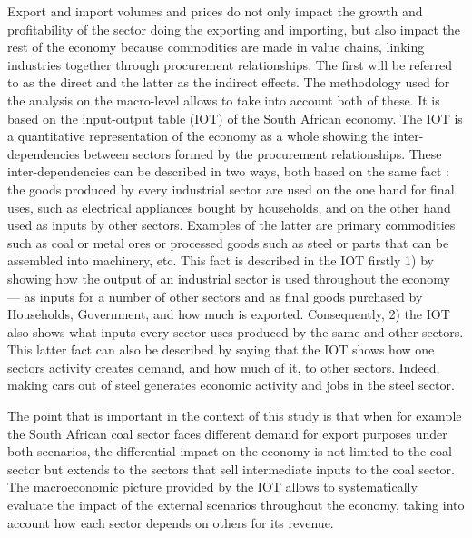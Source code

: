 \documentclass[12pt,english]{article}
\begin{document}
Export and import volumes and prices do not only impact the growth and profitability of the sector doing the exporting and importing, but also impact the rest of the economy because commodities are made in value chains, linking industries together through procurement relationships. The first will be referred to as the direct and the latter as the indirect effects. The methodology used for the analysis on the macro-level allows to take into account both of these.%
It is based on the input-output table (IOT) of the South African economy. The IOT is a quantitative representation of the economy as a whole showing the inter-dependencies between sectors formed by the procurement relationships. These inter-dependencies can be described in two ways, both based on the same fact : the goods produced by every industrial sector are used on the one hand for final uses, such as electrical appliances bought by households, and on the other hand used as inputs by other sectors. Examples of the latter are primary commodities such as coal or metal ores or processed goods such as steel or parts that can be assembled into machinery, etc. This fact is described in the IOT firstly 1) by showing how the output of an industrial sector is used throughout the economy --- as inputs for a number of other sectors and as final goods purchased by Households, Government, and how much is exported. Consequently, 2) the IOT also shows what inputs every sector uses produced by the same and other sectors. This latter fact can also be described by saying that the IOT shows how one sectors activity creates demand, and how much of it, to other sectors. Indeed, making cars out of steel generates economic activity and jobs in the steel sector. 

The point that is important in the context of this study %
is that when for example the South African coal sector faces different demand for export purposes under both scenarios, the differential impact on the economy is not limited to the coal sector but extends to the sectors that sell intermediate inputs to the coal sector. The macroeconomic picture provided by the IOT allows to systematically evaluate the impact of the external scenarios throughout the economy, taking into account how each sector depends on others for its revenue. %
\end{document}
